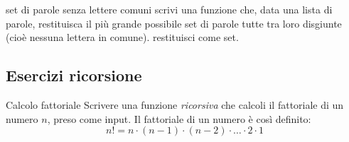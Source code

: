 \begin{esercizio}{set di parole senza lettere comuni}
	scrivi una funzione che, data una lista di parole, restituisca il più grande possibile set di parole tutte tra loro disgiunte (cioè nessuna lettera in comune). restituisci come set.
\end{esercizio}

%
%
%
%
%
%
%
%
%
\subsection{Esercizi ricorsione}
\begin{esercizio}{Calcolo fattoriale}
	Scrivere una funzione \textit{ricorsiva} che calcoli il fattoriale di un numero $ n $, preso come input. Il fattoriale di un numero è così definito:
	\[
		n! = n \cdot \left(n-1\right) \cdot \left(n-2\right) \cdot \ldots \cdot 2 \cdot 1
	\]
\end{esercizio}

